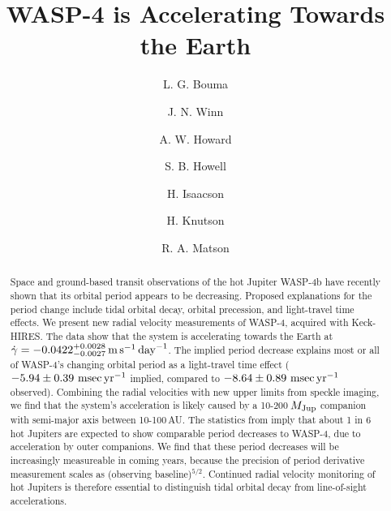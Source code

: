 \documentclass[12pt,twocolumn,tighten]{aastex62}
\begin{document}

\title{WASP-4 is Accelerating Towards the Earth}


%
%
\author[0000-0002-0514-5538]{L. G. Bouma}
%
\author[0000-0002-4265-047X]{J. N. Winn}

%
%
\author[0000-0001-8638-0320]{A. W. Howard}
%
\author{S. B. Howell}
%
\author[0000-0002-0531-1073]{H. Isaacson}
%
\author{H. Knutson}
%
\author{R. A. Matson}
%

\begin{abstract}
  Space and ground-based transit observations of the hot Jupiter
  WASP-4b have recently shown that its orbital period appears to be
  decreasing.  Proposed explanations for the period change include
  tidal orbital decay, orbital precession, and light-travel time
  effects.  We present new radial velocity measurements of WASP-4,
  acquired with Keck-HIRES.  The data show that the system is
  accelerating towards the Earth at $\dot{\gamma} =
  -0.0422^{+0.0028}_{-0.0027}\,{\rm m}\,{\rm s}^{-1}\,{\rm day}^{-1}$.
  The implied period decrease explains most or all of WASP-4's
  changing orbital period as a light-travel time effect ($-5.94 \pm
  0.39~{\rm msec}\,{\rm yr}^{-1}$ implied, compared to $-8.64 \pm
  0.89~{\rm msec}\,{\rm yr}^{-1}$ observed).  Combining the radial
  velocities with new upper limits from speckle imaging, we find that
  the system's acceleration is likely caused by a 10-200$\,M_{\rm
  Jup}$ companion with semi-major axis between 10-100$\,$AU.  The
  statistics from \citet{knutson_friends_2014} imply that about 1 in 6
  hot Jupiters are expected to show comparable period decreases to
  WASP-4, due to acceleration by outer companions.  We find that these
  period decreases will be increasingly measureable in coming years,
  because the precision of period derivative measurement scales as
  (observing baseline)$^{5/2}$.  Continued radial velocity monitoring
  of hot Jupiters is therefore essential to distinguish tidal orbital
  decay from line-of-sight accelerations.
\end{abstract}
\end{document}
